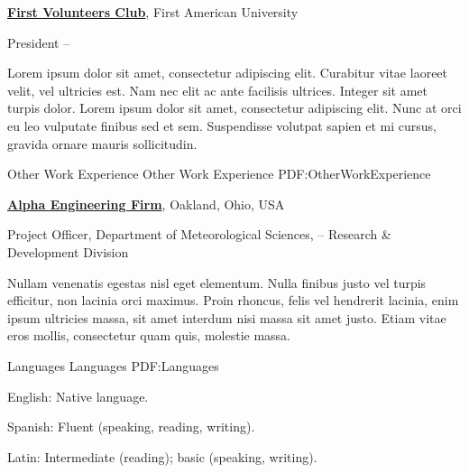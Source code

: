 \documentclass[letterpaper,MMMyyyy,nonstopmode]{simpleresumecv}
\begin{document}
\begin{Body}
{\Entry
\href{http://www.example.com/my-club}
{\textbf{First Volunteers Club}},
First American University

\Gap
\BulletItem
President
\hfill
{} --
\begin{Detail}
\SubBulletItem
Lorem ipsum dolor sit amet, consectetur adipiscing elit.
\SubBulletItem
Curabitur vitae laoreet velit, vel ultricies est. Nam nec elit ac ante facilisis ultrices.
\SubBulletItem
Integer sit amet turpis dolor. Lorem ipsum dolor sit amet, consectetur adipiscing elit. Nunc at orci eu leo vulputate finibus sed et sem.
\SubBulletItem
Suspendisse volutpat sapien et mi cursus, gravida ornare mauris sollicitudin.
\end{Detail}


\Section
{Other Work\newline
Experience}
{Other Work Experience}
{PDF:OtherWorkExperience}

\Entry
\href{http://www.example.com/my-company}
{\textbf{Alpha Engineering Firm}},
Oakland, Ohio, USA

\Gap
\BulletItem
Project Officer,
Department of Meteorological Sciences,
\hfill
{} --
\newline
Research \& Development Division
\begin{Detail}
\SubBulletItem
Nullam venenatis egestas nisl eget elementum.
\SubBulletItem
Nulla finibus justo vel turpis efficitur, non lacinia orci maximus. Proin rhoncus, felis vel hendrerit lacinia, enim ipsum ultricies massa, sit amet interdum nisi massa sit amet justo.
\SubBulletItem
Etiam vitae eros mollis, consectetur quam quis, molestie massa.
\end{Detail}


\Section
{Languages}
{Languages}
{PDF:Languages}

\BulletItem
English: Native language.

\Gap
\BulletItem
Spanish: Fluent (speaking, reading, writing).

\Gap
\BulletItem
Latin: Intermediate (reading); basic (speaking, writing).





}
\end{Body}
\end{document}
